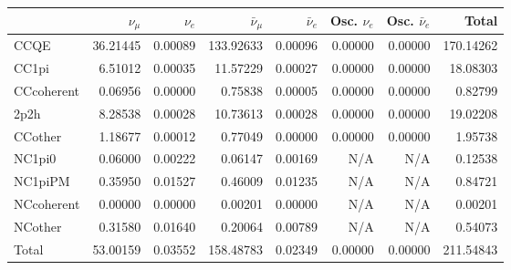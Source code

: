\begin{tabular} { | l ||r | r | r | r | r | r | | r | }
\hline
              & $\nu_\mu$            & $\nu_e$              & $\bar{\nu}_{\mu}$    & $\bar{\nu}_{e}$      & Osc. $\nu_e$         & Osc. $\bar{\nu}_{e}$ & Total                \\ \hline\hline
 CCQE         & 36.21445             & 0.00089              & 133.92633            & 0.00096              & 0.00000              & 0.00000              & 170.14262            \\ \hline
 CC1pi        & 6.51012              & 0.00035              & 11.57229             & 0.00027              & 0.00000              & 0.00000              & 18.08303             \\ \hline
 CCcoherent   & 0.06956              & 0.00000              & 0.75838              & 0.00005              & 0.00000              & 0.00000              & 0.82799              \\ \hline
 2p2h         & 8.28538              & 0.00028              & 10.73613             & 0.00028              & 0.00000              & 0.00000              & 19.02208             \\ \hline
 CCother      & 1.18677              & 0.00012              & 0.77049              & 0.00000              & 0.00000              & 0.00000              & 1.95738              \\ \hline
 NC1pi0       & 0.06000              & 0.00222              & 0.06147              & 0.00169              & N/A                  & N/A                  & 0.12538              \\ \hline
 NC1piPM      & 0.35950              & 0.01527              & 0.46009              & 0.01235              & N/A                  & N/A                  & 0.84721              \\ \hline
 NCcoherent   & 0.00000              & 0.00000              & 0.00201              & 0.00000              & N/A                  & N/A                  & 0.00201              \\ \hline
 NCother      & 0.31580              & 0.01640              & 0.20064              & 0.00789              & N/A                  & N/A                  & 0.54073              \\ \hline
\hline
 Total        & 53.00159             & 0.03552              & 158.48783            & 0.02349              & 0.00000              & 0.00000              & 211.54843            \\ \hline

\end{tabular}

